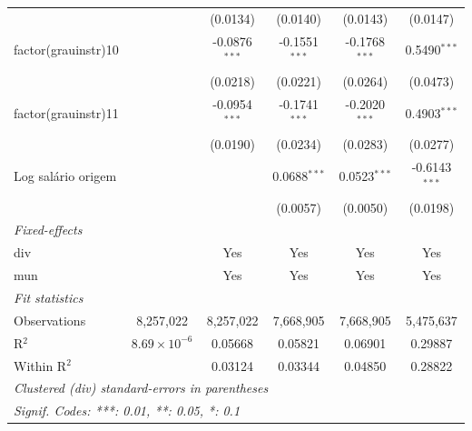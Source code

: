 \begin{tabular}{lccccc}
                            &                       & (0.0134)                & (0.0140)                & (0.0143)                & (0.0147)\\   
   factor(grauinstr)10      &                       & -0.0876$^{***}$         & -0.1551$^{***}$         & -0.1768$^{***}$         & 0.5490$^{***}$\\   
                            &                       & (0.0218)                & (0.0221)                & (0.0264)                & (0.0473)\\   
   factor(grauinstr)11      &                       & -0.0954$^{***}$         & -0.1741$^{***}$         & -0.2020$^{***}$         & 0.4903$^{***}$\\   
                            &                       & (0.0190)                & (0.0234)                & (0.0283)                & (0.0277)\\   
   Log salário origem       &                       &                         & 0.0688$^{***}$          & 0.0523$^{***}$          & -0.6143$^{***}$\\   
                            &                       &                         & (0.0057)                & (0.0050)                & (0.0198)\\   
   \midrule
   \emph{Fixed-effects}\\
   div                      &                       & Yes                     & Yes                     & Yes                     & Yes\\  
   mun                      &                       & Yes                     & Yes                     & Yes                     & Yes\\  
   \midrule
   \emph{Fit statistics}\\
   Observations             & 8,257,022             & 8,257,022               & 7,668,905               & 7,668,905               & 5,475,637\\  
   R$^2$                    & $8.69\times 10^{-6}$  & 0.05668                 & 0.05821                 & 0.06901                 & 0.29887\\  
   Within R$^2$             &                       & 0.03124                 & 0.03344                 & 0.04850                 & 0.28822\\  
   \midrule \midrule
   \multicolumn{6}{l}{\emph{Clustered (div) standard-errors in parentheses}}\\
   \multicolumn{6}{l}{\emph{Signif. Codes: ***: 0.01, **: 0.05, *: 0.1}}\\
\end{tabular}
\par\endgroup


